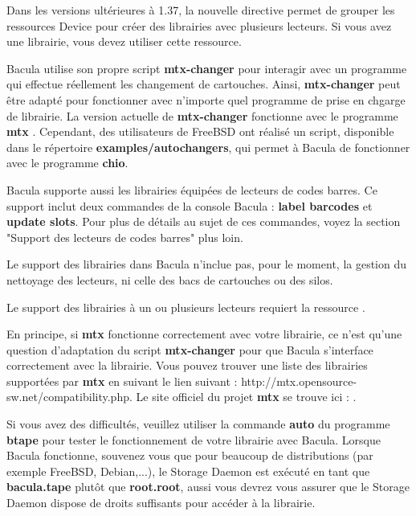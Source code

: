 Dans les versions ult\'erieures \`a 1.37, la nouvelle directive 
 permet de grouper les ressources 
Device pour cr\'eer des librairies avec plusieurs lecteurs. Si vous avez une 
librairie, vous devez utiliser cette ressource.

Bacula utilise son propre script {\bf mtx-changer} pour interagir avec un 
programme qui effectue r\'eellement les changement de cartouches. Ainsi, 
{\bf mtx-changer} peut \^etre adapt\'e pour fonctionner avec n'importe quel 
programme de prise en chgarge de librairie. La version actuelle de 
{\bf mtx-changer} fonctionne avec le programme {\bf mtx} . Cependant, 
des utilisateurs de FreeBSD ont r\'ealis\'e un script, disponible dans 
le r\'epertoire {\bf examples/autochangers}, qui permet \`a Bacula de fonctionner 
avec le programme {\bf chio}.

Bacula supporte aussi les librairies \'equip\'ees de lecteurs de codes barres. 
Ce support inclut deux commandes de la console Bacula : {\bf label barcodes} 
et {\bf update slots}. Pour plus de d\'etails au sujet de ces commandes, 
voyez la section "Support des lecteurs de codes barres" plus loin.

Le support des librairies dans Bacula n'inclue pas, pour le moment, la gestion 
du nettoyage des lecteurs, ni celle des bacs de cartouches ou des silos. 

Le support des librairies \`a un ou plusieurs lecteurs requiert la ressource 
.                          

En principe, si {\bf mtx} fonctionne correctement avec votre librairie, ce 
n'est qu'une question d'adaptation du script {\bf mtx-changer} pour que 
Bacula s'interface correctement avec la librairie. Vous pouvez trouver une 
liste des librairies support\'ees par  {\bf mtx}  en suivant le lien suivant : 
{http://mtx.opensource-sw.net/compatibility.php}.
Le site officiel du projet  {\bf mtx} se trouve ici : 
.

Si vous avez des difficult\'es, veuillez utiliser la commande  {\bf auto} du 
programme  {\bf btape} pour tester le fonctionnement de votre librairie 
avec Bacula. Lorsque Bacula fonctionne, souvenez vous que pour beaucoup de 
distributions (par exemple FreeBSD, Debian,...), le Storage Daemon est 
ex\'ecut\'e en tant que {\bf bacula.tape}  plut\^ot que {\bf root.root}, aussi 
vous devrez vous assurer que le Storage Daemon dispose de droits suffisants pour 
acc\'eder \`a la librairie.

